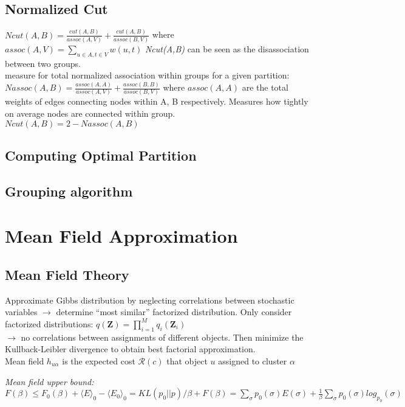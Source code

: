 \documentclass[9pt,parskip]{scrartcl}
\begin{document}
\begin{multicols*}{4}
\subsection*{Normalized Cut}
$Ncut(A,B) = \frac{cut(A,B)}{assoc(A,V)} + \frac{cut(A,B)}{assoc(B,V)}$ where $assoc(A,V) = \sum_{u \in A, t \in V} w(u,t) $
\textit{Ncut(A,B)} can be seen as the disassociation between two groups. \\
 measure for total
normalized association within groups for a given partition:\\
$Nassoc(A,B) = \frac{assoc(A,A)}{assoc(A,V)} + \frac{assoc(B,B)}{assoc(B,V)}$ where $assoc(A,A) $ are the total weights of edges connecting nodes within A, B respectively. Measures how tightly on average nodes are connected within group. \\
$Ncut(A,B) = 2 - Nassoc(A,B)$ \\
\subsection*{Computing Optimal Partition}

\subsection*{Grouping algorithm}

\section*{Mean Field Approximation}
\subsection*{Mean Field Theory}
Approximate Gibbs distribution by neglecting correlations between stochastic variables $\to$ determine "`most similar"' factorized distribution.
Only consider factorized distributions: 
$q(\mathbf{Z}) = \prod_{i=1}^{M} q_i(\mathbf{Z}_i)$ \\
$\to$ no correlations between assignments of different objects.
Then minimize the Kullback-Leibler divergence to obtain best factorial approximation. \\
Mean field $h_{u \alpha}$ is the expected cost $\mathcal{R}(c)$ that object $u$ assigned to cluster $\alpha$ 

\textit{Mean field upper bound: }
$F(\beta) \leq F_0(\beta) + \langle E \rangle_0 - \langle E_0 \rangle_0 = KL(p_0||p)/\beta + F(\beta) = \sum_{\sigma}p_0(\sigma)E(\sigma) + \frac{1}{\beta} \sum_{\sigma} p_0(\sigma)log_{p_0}(\sigma)$



\end{multicols*}
\end{document}
